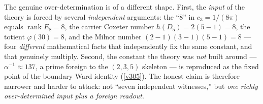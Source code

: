 \begin{keybox}
The genuine over-determination is of a different shape. First, the \emph{input} of the theory is forced
by several \emph{independent} arguments: the ``$8$'' in $c_3=1/(8\pi)$ equals $\operatorname{rank}E_8=8$,
the carrier Coxeter number $h(D_5)=2(5{-}1)=8$, the totient $\varphi(30)=8$, and the Milnor number
$(2{-}1)(3{-}1)(5{-}1)=8$ --- four \emph{different} mathematical facts that independently fix the same
constant, and that genuinely multiply. Second, the constant the theory was \emph{not} built around ---
$\alpha^{-1}\approx 137$, a prime foreign to the $(2,3,5)$ skeleton --- is reproduced as the fixed point
of the boundary Ward identity (\vref{v305}). The honest claim is therefore narrower and harder to attack:
not ``seven independent witnesses,'' but \emph{one richly over-determined input plus a foreign readout}.
\end{keybox}
